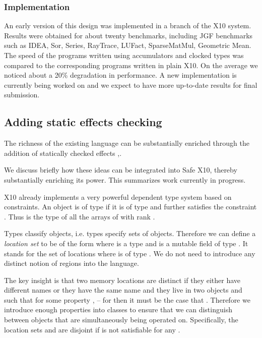 
\subsubsection{Implementation}
An early version of this design was implemented in a branch of the X10
system. Results were obtained for about twenty benchmarks, including
JGF benchmarks such as IDEA, Sor, Series, RayTrace, LUFact,
SparseMatMul, Geometric Mean.  The speed of the programs written using
accumulators and clocked types was compared to the corresponding
programs written in plain X10. On the average we noticed about a 20\%
degradation in performance. A new implementation is currently being
worked on and we expect to have more up-to-date results for final submission.

\subsection{Adding static effects checking}

The richness of the existing language can be substantially enriched
through the addition of statically checked effects
\cite{Gifford:1986:IFI:319838.319848},\cite{DPJ}.

We discuss briefly how these ideas can be integrated into Safe X10,
thereby substantially enriching its power. This summarizes work
currently in progress.

X10 already implements a very powerful dependent type system based on
constraints. An object  is of type  if it is of
type  and further satisfies the constraint
. Thus  is the type of all
the arrays of  with rank .

Types classify objects, i.e.{} types specify sets of
objects. Therefore we can define a {\em location set} to be of the form
 where  is a type and  is a mutable field of
type . It stands for the set of locations  where
 is of type . We do not need to introduce any distinct
notion of regions into the language.

The key insight is that two memory locations are distinct if they
either have different names or they have the same name  and
they live in two objects  and  such that for some
property ,  -- for then it must be the case
that . Therefore we introduce enough properties into
classes to ensure that we can distinguish between objects that are
simultaneously being operated on. Specifically, the location sets
 and  are disjoint if
 is not satisfiable for any .

